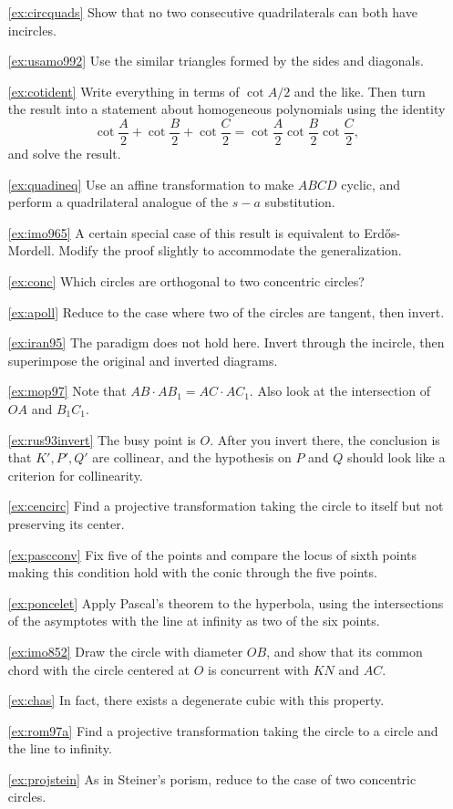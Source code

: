 \documentclass[12pt]{book}
\numberwithin{exc}{section}
\numberwithin{figure}{section}
\numberwithin{equation}{theorem}
\begin{document}
\begin{itemize}
\item[\ref{ex:circquads}]
Show that no two consecutive quadrilaterals can both have 
incircles.
\item[\ref{ex:usamo992}]
Use the similar triangles formed by the sides and diagonals.
\item[\ref{ex:cotident}]
Write everything in terms of $\cot A/2$ and the like. Then turn the 
result into a statement about homogeneous polynomials using the 
identity
\[
\cot \frac{A}{2} + \cot \frac B2 + \cot \frac C2
=
\cot \frac{A}{2} \cot \frac B2 \cot \frac C2,
\]
and solve the result.
\item[\ref{ex:quadineq}]
Use an affine transformation to make $ABCD$ cyclic, and 
perform a quadrilateral analogue of the $s-a$ substitution.
\item[\ref{ex:imo965}]
A certain special case of this result is equivalent to 
Erd\H{o}s-Mordell. Modify the proof slightly to accommodate the 
generalization.
\item[\ref{ex:conc}]
Which circles are orthogonal to two concentric circles?
\item[\ref{ex:apoll}]
Reduce to the case where two of the circles are tangent, then invert.
\item[\ref{ex:iran95}]
The paradigm does not hold here.
Invert through the incircle, then superimpose the 
original and inverted diagrams.
\item[\ref{ex:mop97}]
Note that $AB \cdot AB_1 = AC \cdot AC_1$. Also look at the
intersection of $OA$ and $B_1 C_1$.
\item[\ref{ex:rus93invert}]
The busy point is $O$. After you invert there, the conclusion is that
$K', P', Q'$ are collinear, and the hypothesis on $P$ and $Q$ should look
like a criterion for collinearity.
\item[\ref{ex:cencirc}]
Find a projective
transformation taking the circle to itself but not preserving its center.
\item[\ref{ex:pascconv}]
Fix five of the points and compare the locus of sixth points making 
this condition hold with the conic through the five points.
\item[\ref{ex:poncelet}]
Apply Pascal's 
theorem to the hyperbola, using the intersections of the asymptotes 
with the line at infinity as two of the six points.
\item[\ref{ex:imo852}]
Draw the circle with diameter $OB$, and show that its
common chord with the circle centered at $O$ is concurrent with $KN$
and $AC$.
\item[\ref{ex:chas}]
In fact, there exists a degenerate cubic with this property.
\item[\ref{ex:rom97a}]
Find a projective transformation taking the circle to a circle and
the line to infinity.
\item[\ref{ex:projstein}]
As in Steiner's porism, reduce to the case of two concentric circles.
\end{itemize}
\end{document}

